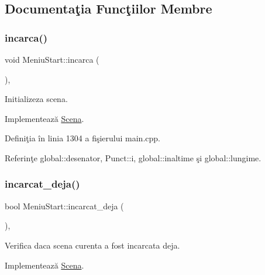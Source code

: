 \subsection{Documentaţia Funcţiilor Membre}
\mbox{\label{classMeniuStart_afb59dcb21968a6ccd685a6c9c0d6a0c1}} 
\subsubsection{\texorpdfstring{incarca()}{incarca()}}
{\footnotesize\ttfamily void Meniu\+Start\+::incarca (\begin{DoxyParamCaption}\item[{\hyperlink{classStadiulJocului}{Stadiul\+Jocului} \&}]{ }\end{DoxyParamCaption})\hspace{0.3cm}{\ttfamily [override]}, {\ttfamily [virtual]}}

Initializeza scena. 

Implementează \hyperlink{classScena_a6f53a1dcef68084361dc8f9d56bbb8c0}{Scena}.



Definiţia în linia 1304 a fişierului main.\+cpp.



Referinţe global\+::desenator, Punct\+::i, global\+::inaltime şi global\+::lungime.

\mbox{\label{classMeniuStart_a76d8d1b449800060994971ea9df75fd3}} 
\subsubsection{\texorpdfstring{incarcat\+\_\+deja()}{incarcat\_deja()}}
{\footnotesize\ttfamily bool Meniu\+Start\+::incarcat\+\_\+deja (\begin{DoxyParamCaption}{ }\end{DoxyParamCaption})\hspace{0.3cm}{\ttfamily [override]}, {\ttfamily [virtual]}}

Verifica daca scena curenta a fost incarcata deja. 

Implementează \hyperlink{classScena_ac8de771024795dffa0e5feb8dba881ff}{Scena}.



